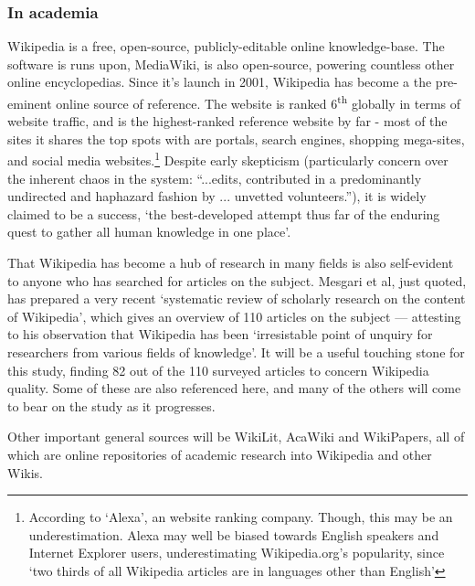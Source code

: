 \documentclass[a4paper,11pt,twoside,notitlepage]{article}
\newcommand{\super}[1]{\textsuperscript{#1}}
\begin{document}
        \subsubsection*{In academia}
        Wikipedia is a free, open-source, publicly-editable online
        knowledge-base. The software is runs upon, MediaWiki, is also
        open-source, powering countless other online
        encyclopedias. Since it's launch in 2001, Wikipedia has become
        a the pre-eminent online source of reference. The website is
        ranked 6\super{th} globally in terms of website traffic, and
        is the highest-ranked reference website by far - most of the
        sites it shares the top spots with are portals, search
        engines, shopping mega-sites, and social media
        websites.\footnote{According to `Alexa', an website ranking
          company.\cite{Alexa-about2014} Though, this may be an
          underestimation. Alexa may well be biased towards English
          speakers and Internet Explorer users, underestimating
          Wikipedia.org's popularity, since `two thirds of all
          Wikipedia articles are in languages other than
          English'\cite{wikimedia-noteonalexa}} Despite early
        skepticism (particularly concern over the inherent chaos in
        the system: ``...edits, contributed in a predominantly
        undirected and haphazard fashion by ... unvetted
        volunteers.''\cite{Wilkinson2007}), it is widely claimed to be
        a success, `the best-developed attempt thus far of the
        enduring quest to gather all human knowledge in one
        place'\cite{Mesgari2014}.

        That Wikipedia has become a hub of research in many fields is
        also self-evident to anyone who has searched for articles on
        the subject. Mesgari et al, just quoted, has prepared a very
        recent `systematic review of scholarly research on the content
        of Wikipedia', which gives an overview of 110 articles on the
        subject --- attesting to his observation that Wikipedia
        has been `irresistable point of unquiry for researchers from
        various fields of knowledge'. It will be a useful touching
        stone for this study, finding 82 out of the 110 surveyed
        articles to concern Wikipedia quality. Some of these are also
        referenced here, and many of the others will come to bear on
        the study as it progresses.

        Other important general sources will be WikiLit,\cite{wikilit}
        AcaWiki\cite{acawiki} and WikiPapers\cite{wikipapers}, all of
        which are online repositories of academic research into
        Wikipedia and other Wikis.       
\end{document}
